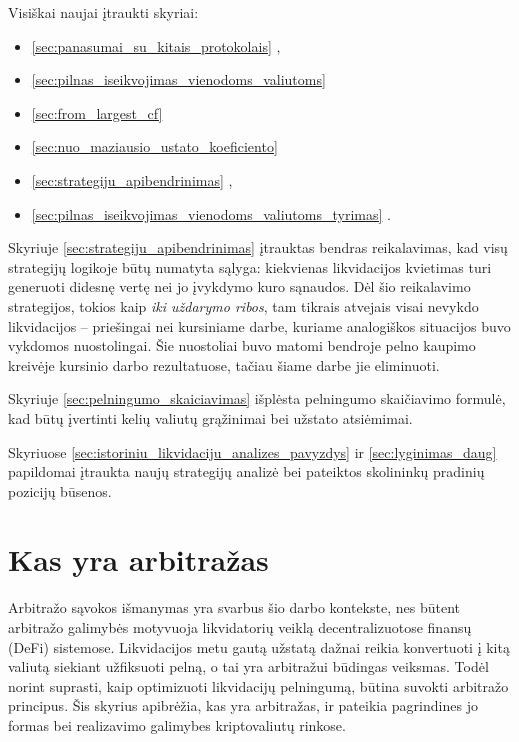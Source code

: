 \documentclass[]{VUMIFTemplateClass}
\begin{document}
Visiškai naujai įtraukti skyriai:
\begin{itemize}
\item \ref{sec:panasumai_su_kitais_protokolais} ,
\item \ref{sec:pilnas_iseikvojimas_vienodoms_valiutoms} 
\item \ref{sec:from_largest_cf} 
\item \ref{sec:nuo_maziausio_ustato_koeficiento} 
\item \ref{sec:strategiju_apibendrinimas} ,
\item \ref{sec:pilnas_iseikvojimas_vienodoms_valiutoms_tyrimas} .
\end{itemize}

Skyriuje \ref{sec:strategiju_apibendrinimas} įtrauktas bendras reikalavimas, kad visų strategijų logikoje būtų numatyta sąlyga: kiekvienas likvidacijos kvietimas turi generuoti didesnę vertę nei jo įvykdymo kuro sąnaudos. Dėl šio reikalavimo strategijos, tokios kaip \textit{iki uždarymo ribos}, tam tikrais atvejais visai nevykdo likvidacijos – priešingai nei kursiniame darbe, kuriame analogiškos situacijos buvo vykdomos nuostolingai. Šie nuostoliai buvo matomi bendroje pelno kaupimo kreivėje kursinio darbo rezultatuose, tačiau šiame darbe jie eliminuoti.

Skyriuje \ref{sec:pelningumo_skaiciavimas} išplėsta pelningumo skaičiavimo formulė, kad būtų įvertinti kelių valiutų grąžinimai bei užstato atsiėmimai.

Skyriuose \ref{sec:istoriniu_likvidaciju_analizes_pavyzdys} ir \ref{sec:lyginimas_daug} papildomai įtraukta naujų strategijų analizė bei pateiktos skolininkų pradinių pozicijų būsenos.

\section{Kas yra arbitražas}
Arbitražo sąvokos išmanymas yra svarbus šio darbo kontekste, nes būtent arbitražo galimybės motyvuoja likvidatorių veiklą decentralizuotose finansų (DeFi) sistemose. Likvidacijos metu gautą užstatą dažnai reikia konvertuoti į kitą valiutą siekiant užfiksuoti pelną, o tai yra arbitražui būdingas veiksmas. Todėl norint suprasti, kaip optimizuoti likvidacijų pelningumą, būtina suvokti arbitražo principus. Šis skyrius apibrėžia, kas yra arbitražas, ir pateikia pagrindines jo formas bei realizavimo galimybes kriptovaliutų rinkose.
\end{document}
